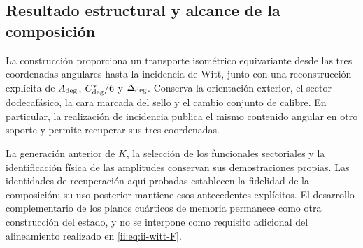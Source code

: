 \subsection{Resultado estructural y alcance de la composición}

La construcción proporciona un transporte isométrico equivariante desde
las tres coordenadas angulares hasta la incidencia de Witt, junto con una
reconstrucción explícita de \(A_{\rm deg}\), \(C^*_{\rm deg}/6\) y
\(\Delta_{\rm deg}\). Conserva la orientación exterior, el sector
dodecafásico, la cara marcada del sello y el cambio conjunto de calibre.
En particular, la realización de incidencia publica el mismo contenido
angular en otro soporte y permite recuperar sus tres coordenadas.

La generación anterior de \(K\), la selección de los funcionales
sectoriales y la identificación física de las amplitudes conservan sus
demostraciones propias. Las identidades de recuperación aquí probadas
establecen la fidelidad de la composición; su uso posterior mantiene
esos antecedentes explícitos. El desarrollo complementario de los planos
cuárticos de memoria permanece como otra construcción del estado, y no
se interpone como requisito adicional del alineamiento realizado en
\eqref{ii:eq:ii-witt-F}.
